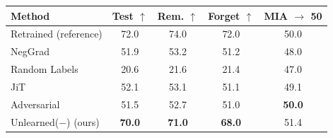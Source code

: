 {\footnotesize\setlength{\tabcolsep}{3pt}
\begin{tabular}{@{}lcccc@{}}
\toprule
Method & Test $\uparrow$ & Rem. $\uparrow$ & Forget $\uparrow$ & MIA $\to$ 50 \\
\midrule
Retrained (reference) & 72.0 & 74.0 & 72.0 & 50.0 \\
\midrule
NegGrad & 51.9 & 53.2 & 51.2 & 48.0 \\
Random Labels & 20.6 & 21.6 & 21.4 & 47.0 \\
JiT & 52.1 & 53.1 & 51.1 & 49.1 \\
Adversarial & 51.5 & 52.7 & 51.0 & \textbf{50.0} \\
Unlearned($-$) (ours) & \textbf{70.0} & \textbf{71.0} & \textbf{68.0} & 51.4 \\
\bottomrule
\end{tabular}}
